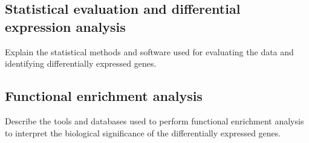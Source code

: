 \subsection{Statistical evaluation and differential expression analysis}
Explain the statistical methods and software used for evaluating the data and identifying differentially expressed genes.

\subsection{Functional enrichment analysis}
Describe the tools and databases used to perform functional enrichment analysis to interpret the biological significance of the differentially expressed genes.
